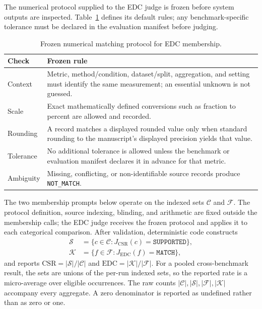 The numerical protocol supplied to the EDC judge is frozen before system
outputs are inspected. Table~\ref{tab:numeric-match} defines its default rules;
any benchmark-specific tolerance must be declared in the evaluation manifest
before judging.

\begin{table}[t]
  \centering
  \small
  \setlength{\tabcolsep}{3pt}
  \begin{tabular}{@{}p{1.45cm}p{5.95cm}@{}}
    \toprule
    \textbf{Check} & \textbf{Frozen rule} \\
    \midrule
    Context & Metric, method/condition, dataset/split, aggregation, and setting
    must identify the same measurement; an essential unknown is not guessed. \\
    Scale & Exact mathematically defined conversions such as fraction to percent
    are allowed and recorded. \\
    Rounding & A record matches a displayed rounded value only when standard
    rounding to the manuscript's displayed precision yields that value. \\
    Tolerance & No additional tolerance is allowed unless the benchmark or
    evaluation manifest declares it in advance for that metric. \\
    Ambiguity & Missing, conflicting, or non-identifiable source records produce
    \texttt{NOT\_MATCH}. \\
    \bottomrule
  \end{tabular}
  \caption{Frozen numerical matching protocol for EDC membership.}
  \label{tab:numeric-match}
\end{table}

The two membership prompts below operate on the indexed sets
$\mathcal{C}$ and $\mathcal{F}$. The protocol definition, source indexing,
blinding, and arithmetic are fixed outside the membership calls; the EDC judge
receives the frozen protocol and applies it to each categorical comparison.
After validation, deterministic code constructs
\begin{align*}
\mathcal{S}&=\{c\in\mathcal{C}:J_{\mathrm{CSR}}(c)
  =\texttt{SUPPORTED}\},\\
\mathcal{K}&=\{f\in\mathcal{F}:J_{\mathrm{EDC}}(f)
  =\texttt{MATCH}\},
\end{align*}
and reports $\mathrm{CSR}=|\mathcal{S}|/|\mathcal{C}|$ and
$\mathrm{EDC}=|\mathcal{K}|/|\mathcal{F}|$. For a pooled cross-benchmark
result, the sets are unions of the per-run indexed sets, so the reported rate is
a micro-average over eligible occurrences. The raw counts
$|\mathcal{C}|,|\mathcal{S}|,|\mathcal{F}|,|\mathcal{K}|$ accompany every
aggregate. A zero denominator is reported as undefined rather than as zero or
one.

